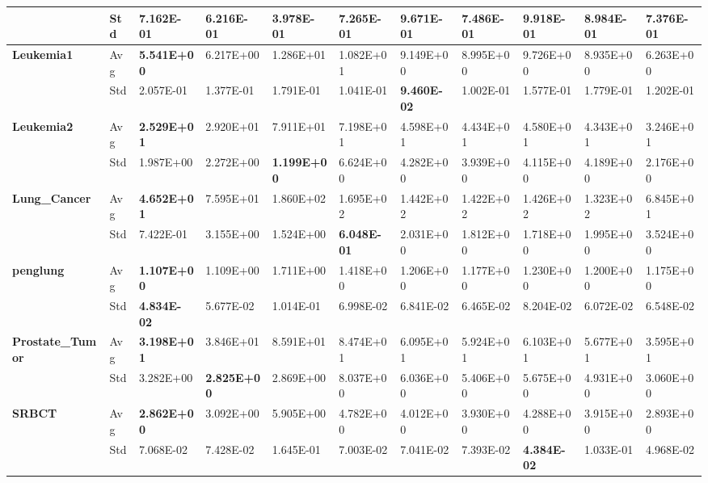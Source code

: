\documentclass{article} %
\begin{document}
\begin{tabular}{|p{0.6in}|p{0.3in}|p{0.4in}|p{0.4in}|p{0.4in}|p{0.4in}|p{0.4in}|p{0.4in}|p{0.4in}|p{0.4in}|p{0.4in}|}
\textbf{} & Std & 7.162E-01\textbf{} & 6.216E-01 & \textbf{3.978E-01} & 7.265E-01 & 9.671E-01 & 7.486E-01 & 9.918E-01 & 8.984E-01 & 7.376E-01 \\ \hline 
\textbf{Leukemia1} & Avg & \textbf{5.541E+00} & 6.217E+00 & 1.286E+01 & 1.082E+01 & 9.149E+00 & 8.995E+00 & 9.726E+00 & 8.935E+00 & 6.263E+00 \\ \hline 
\textbf{} & Std & 2.057E-01\textbf{} & 1.377E-01 & 1.791E-01 & 1.041E-01 & \textbf{9.460E-02} & 1.002E-01 & 1.577E-01 & 1.779E-01 & 1.202E-01 \\ \hline 
\textbf{Leukemia2} & Avg & \textbf{2.529E+01} & 2.920E+01\textbf{} & 7.911E+01 & 7.198E+01 & 4.598E+01\textbf{} & 4.434E+01 & 4.580E+01 & 4.343E+01 & 3.246E+01 \\ \hline 
\textbf{} & Std & 1.987E+00 & 2.272E+00\textbf{} & \textbf{1.199E+00} & 6.624E+00 & 4.282E+00\textbf{} & 3.939E+00 & 4.115E+00 & 4.189E+00 & 2.176E+00 \\ \hline 
\textbf{Lung\_Cancer} & Avg & \textbf{4.652E+01} & 7.595E+01 & 1.860E+02 & 1.695E+02 & 1.442E+02\textbf{} & 1.422E+02 & 1.426E+02 & 1.323E+02 & 6.845E+01 \\ \hline 
\textbf{} & Std & 7.422E-01\textbf{} & 3.155E+00 & 1.524E+00 & \textbf{6.048E-01} & 2.031E+00\textbf{} & 1.812E+00 & 1.718E+00 & 1.995E+00 & 3.524E+00 \\ \hline 
\textbf{penglung} & Avg & \textbf{1.107E+00} & 1.109E+00\textbf{} & 1.711E+00\textbf{} & 1.418E+00 & 1.206E+00 & 1.177E+00 & 1.230E+00\textbf{} & 1.200E+00 & 1.175E+00 \\ \hline 
\textbf{} & Std & \textbf{4.834E-02} & 5.677E-02\textbf{} & 1.014E-01\textbf{} & 6.998E-02 & 6.841E-02 & 6.465E-02 & 8.204E-02\textbf{} & 6.072E-02 & 6.548E-02 \\ \hline 
\textbf{Prostate\_Tumor} & Avg & \textbf{3.198E+01} & 3.846E+01 & 8.591E+01 & 8.474E+01 & 6.095E+01\textbf{} & 5.924E+01 & 6.103E+01\textbf{} & 5.677E+01 & 3.595E+01 \\ \hline 
\textbf{} & Std & 3.282E+00\textbf{} & \textbf{2.825E+00} & 2.869E+00 & 8.037E+00 & 6.036E+00\textbf{} & 5.406E+00 & 5.675E+00\textbf{} & 4.931E+00 & 3.060E+00 \\ \hline 
\textbf{SRBCT} & Avg & \textbf{2.862E+00} & 3.092E+00 & 5.905E+00 & 4.782E+00 & 4.012E+00\textbf{} & 3.930E+00 & 4.288E+00\textbf{} & 3.915E+00 & 2.893E+00 \\ \hline 
\textbf{} & Std & 7.068E-02 & 7.428E-02 & 1.645E-01 & 7.003E-02 & 7.041E-02\textbf{} & 7.393E-02 & \textbf{4.384E-02} & 1.033E-01 & 4.968E-02\textbf{} \\ \hline 
\end{tabular}
\end{document}
